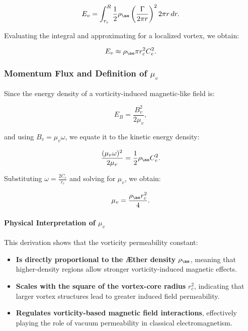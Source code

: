 \begin{equation*}
    E_v = \int_{r_c}^{R} \frac{1}{2} \rho_{\ae} \left( \frac{\Gamma}{2\pi r} \right)^2 2\pi r \, dr.
\end{equation*}

Evaluating the integral and approximating for a localized vortex, we obtain:

\begin{equation*}
    E_v \approx \rho_{\ae} \pi r_c^2 C_e^2.
\end{equation*}

\subsubsection*{Momentum Flux and Definition of \( \mu_v \)}
Since the energy density of a vorticity-induced magnetic-like field is:

\begin{equation*}
    E_B = \frac{B_v^2}{2\mu_v},
\end{equation*}

and using \( B_v = \mu_v \omega \), we equate it to the kinetic energy density:

\begin{equation*}
    \frac{(\mu_v \omega)^2}{2\mu_v} = \frac{1}{2} \rho_{\ae} C_e^2.
\end{equation*}

Substituting \( \omega = \frac{2C_e}{r_c} \) and solving for \( \mu_v \), we obtain:

\begin{equation*}
    \mu_v = \frac{\rho_{\ae} r_c^2}{4}.
\end{equation*}

\paragraph*{Physical Interpretation of \( \mu_v \)}
This derivation shows that the vorticity permeability constant:

\begin{itemize}
    \item \textbf{Is directly proportional to the Æther density} \( \rho_{\ae} \), meaning that higher-density regions allow stronger vorticity-induced magnetic effects.
    \item \textbf{Scales with the square of the vortex-core radius} \( r_c^2 \), indicating that larger vortex structures lead to greater induced field permeability.
    \item \textbf{Regulates vorticity-based magnetic field interactions}, effectively playing the role of vacuum permeability in classical electromagnetism.
\end{itemize}

